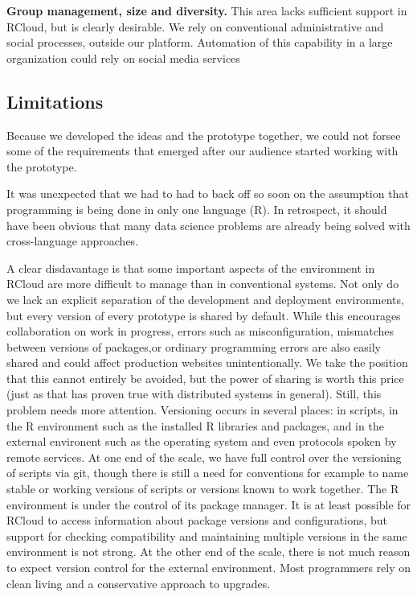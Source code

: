{\bf Group management, size and diversity.} This area lacks sufficient
support in RCloud, but is clearly desirable. We rely on conventional
administrative and social processes, outside our platform. Automation
of this capability in a large organization could rely on social media
services

\subsection{Limitations}

Because we developed the ideas and the prototype together,
we could not forsee some of the requirements that emerged
after our audience started working with the prototype.

It was unexpected that we had to had to back off so soon on
the assumption that programming is being done in only one
language (R). In retrospect, it should have been obvious that
many data science problems are already being solved with
cross-language approaches.

A clear disdavantage is that some important aspects of the environment in
RCloud are more difficult to manage than in conventional systems. Not only
do we lack an explicit separation of the development and deployment
environments, but every version of every prototype is shared by default.
While this encourages collaboration on work in progress, errors such as
misconfiguration, mismatches between versions of packages,or ordinary
programming errors are also easily shared and could affect production
websites unintentionally. We take the position that this cannot entirely
be avoided, but the power of sharing is worth this price (just as that
has proven true with distributed systems in general). Still, this 
problem needs more attention. 
Versioning occurs in several places: in scripts, in the R environment
such as the installed R libraries and packages, and in the external
environent such as the operating system and even protocols spoken by
remote services. At one end of the scale, we have full control over the
versioning of scripts via git, though there is still a need for conventions
for example to name stable or working versions of scripts or versions known
to work together. The R environment is under the control of its package
manager. It is at least possible for RCloud to access information about
package versions and configurations, but support for checking compatibility
and maintaining multiple versions in the same environment is not strong.
At the other end of the scale, there is not much reason to expect version
control for the external environment. Most programmers rely on clean living
and a conservative approach to upgrades.

